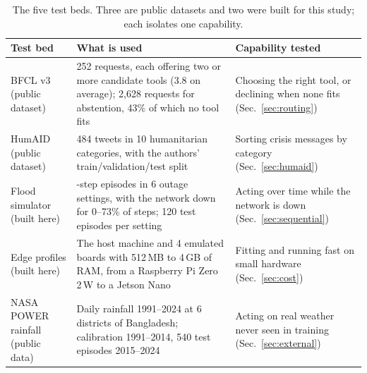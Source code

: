 \documentclass[journal]{IEEEtran}
\begin{document}
\begin{table}[t]
\centering
\caption{The five test beds. Three are public datasets and two were built for
this study; each isolates one capability.}
\label{tab:datasets}
\footnotesize
\setlength{\tabcolsep}{3pt}
\begin{tabular}{@{}>{\raggedright\arraybackslash}p{1.8cm}>{\raggedright\arraybackslash}p{3.85cm}>{\raggedright\arraybackslash}p{2.55cm}@{}}
\toprule
Test bed & What is used & Capability tested \\
\midrule
BFCL v3 \newline (public dataset) & 1{,}252 requests, each offering two or more candidate tools (3.8 on average); 2{,}628 requests for abstention, 43\% of which no tool fits & Choosing the right tool, or declining when none fits (Sec.~\ref{sec:routing}) \\
\addlinespace
HumAID \newline (public dataset) & 76{,}484 tweets in 10 humanitarian categories, with the authors' train/validation/test split & Sorting crisis messages by category (Sec.~\ref{sec:humaid}) \\
\addlinespace
Flood simulator \newline (built here) & 40-step episodes in 6 outage settings, with the network down for 0--73\% of steps; 120 test episodes per setting & Acting over time while the network is down (Sec.~\ref{sec:sequential}) \\
\addlinespace
Edge profiles \newline (built here) & The host machine and 4 emulated boards with 512\,MB to 4\,GB of RAM, from a Raspberry Pi Zero 2\,W to a Jetson Nano & Fitting and running fast on small hardware (Sec.~\ref{sec:cost}) \\
\addlinespace
NASA POWER rainfall \newline (public data) & Daily rainfall 1991--2024 at 6 districts of Bangladesh; calibration 1991--2014, 540 test episodes 2015--2024 & Acting on real weather never seen in training (Sec.~\ref{sec:external}) \\
\bottomrule
\end{tabular}
\end{table}
\end{document}
